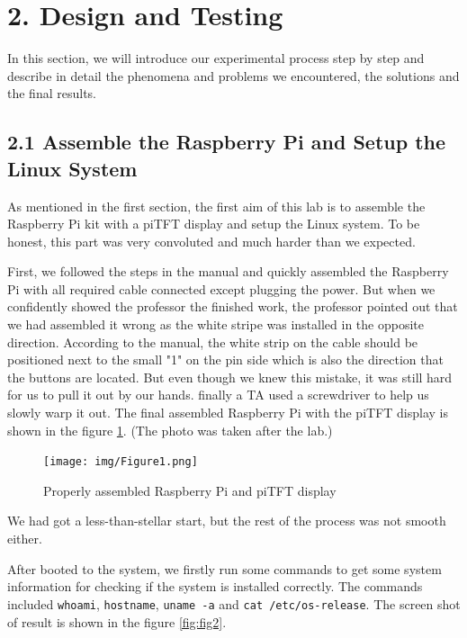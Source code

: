 \documentclass[12pt]{report}
\newcommand{\code}[1]{\colorbox{light-gray}{\texttt{#1}}}
\begin{document}
\section*{2. Design and Testing\vspace{-1em}}
In this section, we will introduce our experimental process step by step and describe in detail the phenomena and problems we encountered, the solutions and the final results.
\subsection*{2.1 \quad Assemble the Raspberry Pi and  Setup the Linux System\vspace{-1em}}
As mentioned in the first section, the first aim of this lab is to assemble the Raspberry Pi kit with a piTFT display and setup the Linux system. To be honest, this part was very convoluted and much harder than we expected. \par
First, we followed the steps in the manual and quickly assembled the Raspberry Pi with all required cable connected except plugging the power. But when we confidently showed the professor the finished work, the professor pointed out that we had assembled it wrong as the white stripe was installed in the opposite direction. According to the manual, the white strip on the cable should be positioned next to the small "1" on the pin side which is also the direction that the buttons are located. But even though we knew this mistake, it was still hard for us to pull it out by our hands. finally a TA used a screwdriver to help us slowly warp it out. The final assembled Raspberry Pi with the piTFT display is shown in the figure \ref{fig:fig1}. (The photo was taken after the lab.)\par
\begin{figure}[H]
    \texttt{[image: img/Figure1.png]}
    \centering
    \caption{Properly assembled Raspberry Pi and piTFT display}
    \label{fig:fig1}
\end{figure}
We had got a less-than-stellar start, but the rest of the process was not smooth either.\par
After booted to the system, we firstly run some commands to get some system information for checking if the system is installed correctly. The commands included \code{whoami}, \code{hostname}, \code{uname -a} and \code{cat /etc/os-release}. The screen shot of result is shown in the figure \ref{fig:fig2}.\par
\end{document}
